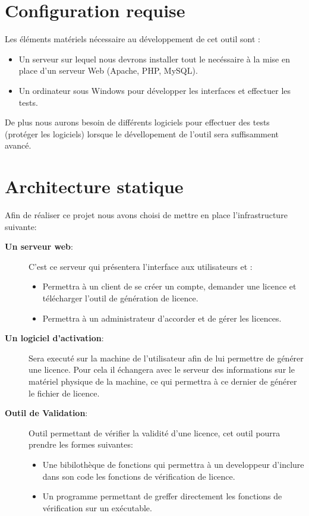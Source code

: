 
\chapter{Configuration requise}

Les éléments matériels nécessaire au développement de cet outil sont :
\begin{itemize}
    \item Un serveur sur lequel nous devrons installer tout le necéssaire à la mise en place d'un serveur Web (Apache, PHP, MySQL).
    \item Un ordinateur sous Windows pour développer les interfaces et effectuer les tests.
\end{itemize}

De plus nous aurons besoin de différents logiciels pour effectuer des tests (protéger les logiciels) lorsque le dévellopement de l'outil sera suffisamment avancé.

\chapter{Architecture statique}
Afin de réaliser ce projet nous avons choisi de mettre en place l'infrastructure suivante:

\begin{description}
	\item[\textbf{Un serveur web}:]
		C'est ce serveur qui présentera l'interface aux utilisateurs et :
		\begin{itemize}
			\item Permettra à un client de se créer un compte, demander une licence et 
			télécharger l'outil de génération de licence.
			\item Permettra à un administrateur d'accorder et de gérer les licences. 
		\end{itemize}
	\item[\textbf{Un logiciel d'activation}:] 
		Sera executé sur la machine de l'utilisateur
		afin de lui permettre de générer une licence. Pour cela il échangera avec
		le serveur des informations sur le matériel physique de la machine, ce 
		qui permettra à ce dernier de générer le fichier de licence.
	\item[\textbf{Outil de Validation}:]
		Outil permettant de vérifier la validité d'une licence, cet outil
		pourra prendre les formes suivantes: 
		\begin{itemize}
		\item Une bibilothèque de fonctions qui permettra à un developpeur d'inclure
		dans son code les fonctions de vérification de licence. 
		\item Un programme permettant de greffer directement les fonctions de vérification
		sur un exécutable. 
		\end{itemize}
\end{description}

